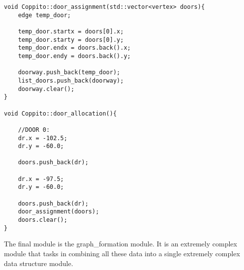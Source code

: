 \begin{lstlisting}
void Coppito::door_assignment(std::vector<vertex> doors){
	edge temp_door;

	temp_door.startx = doors[0].x;
	temp_door.starty = doors[0].y;
	temp_door.endx = doors.back().x;
	temp_door.endy = doors.back().y;

	doorway.push_back(temp_door);
	list_doors.push_back(doorway);
	doorway.clear();
}

void Coppito::door_allocation(){

	//DOOR 0:
	dr.x = -102.5;
	dr.y = -60.0;

	doors.push_back(dr);

	dr.x = -97.5;
	dr.y = -60.0; 

	doors.push_back(dr);
	door_assignment(doors);
	doors.clear();
}
\end{lstlisting}


The final module is the  graph\_formation module. It is an extremely complex module that tasks in combining all these data into a single extremely complex data structure module.

